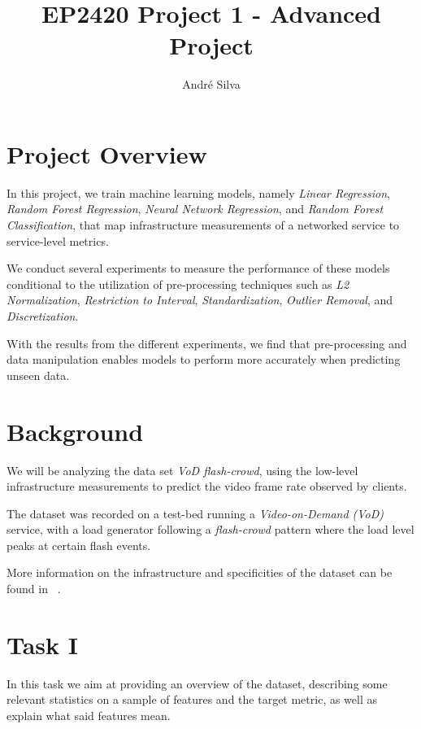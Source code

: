 \documentclass[10pt]{article}
\title{EP2420 Project 1 - Advanced Project}
\author{André Silva}
\begin{document}
\maketitle

\section*{Project Overview}
\label{sec:1}

In this project, we train machine learning models, namely \textit{Linear Regression}, \textit{Random Forest Regression}, \textit{Neural Network Regression}, and \textit{Random Forest Classification}, that map infrastructure measurements of a networked service to service-level metrics.

We conduct several experiments to measure the performance of these models conditional to the utilization of pre-processing techniques such as \textit{L2 Normalization}, \textit{Restriction to Interval}, \textit{Standardization}, \textit{Outlier Removal}, and \textit{Discretization}.

With the results from the different experiments, we find that pre-processing and data manipulation enables models to perform more accurately when predicting unseen data.

\section*{Background}
\label{sec:2}

We will be analyzing the data set \textit{VoD flash-crowd}, using the low-level infrastructure measurements to predict the video frame rate observed by clients.

The dataset was recorded on a test-bed running a \textit{Video-on-Demand (VoD)} service, with a load generator following a \textit{flash-crowd} pattern where the load level peaks at certain flash events.

More information on the infrastructure and specificities of the dataset can be found in ~\cite{9012741}.

\section*{Task I}
\label{sec:3}

In this task we aim at providing an overview of the dataset, describing some relevant statistics on a sample of features and the target metric, as well as explain what said features mean.
\end{document}
